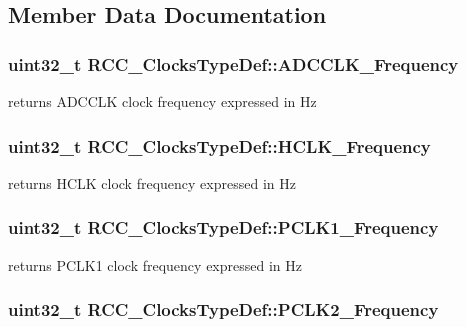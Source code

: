 \subsection{Member Data Documentation}
\hypertarget{structRCC__ClocksTypeDef_aa3dad8af3bb364b6232cf5446d478e7d}{
\subsubsection[{ADCCLK\_\-Frequency}]{\setlength{\rightskip}{0pt plus 5cm}uint32\_\-t {\bf RCC\_\-ClocksTypeDef::ADCCLK\_\-Frequency}}}
\label{structRCC__ClocksTypeDef_aa3dad8af3bb364b6232cf5446d478e7d}
returns ADCCLK clock frequency expressed in Hz \hypertarget{structRCC__ClocksTypeDef_a41b9859d33954117daf7fab42f804b92}{
\subsubsection[{HCLK\_\-Frequency}]{\setlength{\rightskip}{0pt plus 5cm}uint32\_\-t {\bf RCC\_\-ClocksTypeDef::HCLK\_\-Frequency}}}
\label{structRCC__ClocksTypeDef_a41b9859d33954117daf7fab42f804b92}
returns HCLK clock frequency expressed in Hz \hypertarget{structRCC__ClocksTypeDef_add4cfc63c35178d187107edc764e0b8f}{
\subsubsection[{PCLK1\_\-Frequency}]{\setlength{\rightskip}{0pt plus 5cm}uint32\_\-t {\bf RCC\_\-ClocksTypeDef::PCLK1\_\-Frequency}}}
\label{structRCC__ClocksTypeDef_add4cfc63c35178d187107edc764e0b8f}
returns PCLK1 clock frequency expressed in Hz \hypertarget{structRCC__ClocksTypeDef_ad854f0b70a6c4cf6de6dbbdcbc99b856}{
\subsubsection[{PCLK2\_\-Frequency}]{\setlength{\rightskip}{0pt plus 5cm}uint32\_\-t {\bf RCC\_\-ClocksTypeDef::PCLK2\_\-Frequency}}}
